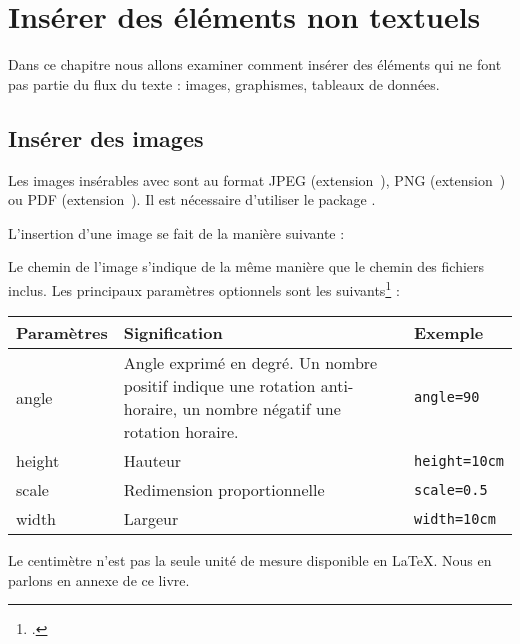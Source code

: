 \chapter{Insérer des éléments non textuels}

\begin{intro}
    Dans ce chapitre nous allons examiner comment insérer des éléments qui ne font pas partie du flux du texte : images, graphismes, tableaux de données.
\end{intro}

\section{Insérer des images}

Les images insérables avec \XeLaTeX sont au format JPEG (extension~), PNG (extension~) ou PDF (extension~). Il est nécessaire d'utiliser le package .


L'insertion d'une image se fait de la manière suivante : 

Le chemin de l'image s'indique de la même manière que le chemin des fichiers inclus.
Les principaux paramètres optionnels sont les suivants\footcite[Pour les autres, on consultera][]{graphicx_options} :

\begin{longtable}{|p{0.2\linewidth}|p{0.6\linewidth}|p{0.2\linewidth}|}
    \hline
    \centering\textbf{Paramètres} & \centering\textbf{Signification} & \centering\textbf{Exemple}    \tabularnewline
    \hline
    \endhead
    \hline
    \endfoot
    angle        & Angle exprimé en degré. Un nombre positif indique une rotation anti-horaire, un nombre négatif une rotation horaire.     & \verb|angle=90| \\
    height        & Hauteur    & \verb|height=10cm|     \\
    scale        & Redimension proportionnelle & \verb|scale=0.5|\\
    width        & Largeur     & \verb|width=10cm|     \\
\end{longtable}

\begin{plusloins}
Le centimètre n'est pas la seule  unité de mesure disponible en \LaTeX. Nous en parlons en annexe de ce livre.
\end{plusloins}


